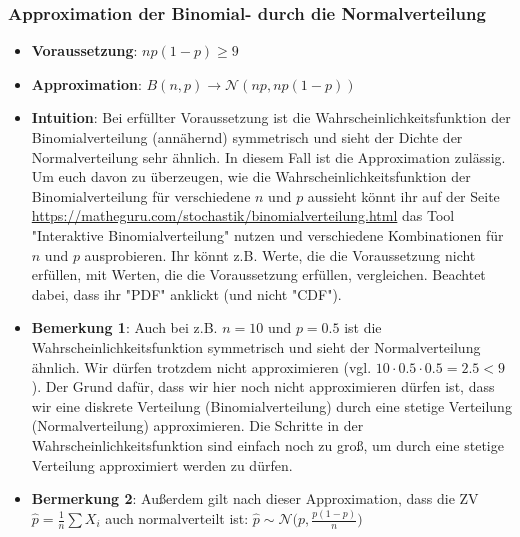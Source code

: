\documentclass[a4paper]{article}
\begin{document}
\subsubsection{Approximation der Binomial- durch die Normalverteilung}\label{sec:BinN}
\begin{itemize}
\item[] \textbf{Voraussetzung}: $np(1-p) \geq 9$
\item[] \textbf{Approximation}: $B(n,p) \rightarrow \mathcal{N}(np,np(1-p))$
\item[] \textbf{Intuition}: Bei erfüllter Voraussetzung ist die Wahrscheinlichkeitsfunktion der Binomialverteilung (annähernd) symmetrisch und sieht der Dichte der Normalverteilung sehr ähnlich. In diesem Fall ist die Approximation zulässig. Um euch davon zu überzeugen, wie die Wahrscheinlichkeitsfunktion der Binomialverteilung für verschiedene $n$ und $p$ aussieht könnt ihr auf der Seite \url{https://matheguru.com/stochastik/binomialverteilung.html} das Tool "Interaktive Binomialverteilung" nutzen und verschiedene Kombinationen für $n$ und $p$ ausprobieren. Ihr könnt z.B. Werte, die die Voraussetzung nicht erfüllen, mit Werten, die die Voraussetzung erfüllen, vergleichen. Beachtet dabei, dass ihr "PDF" anklickt (und nicht "CDF").
\item[] \textbf{Bemerkung 1}: Auch bei z.B. $n=10$ und $p=0.5$ ist die Wahrscheinlichkeitsfunktion symmetrisch und sieht der Normalverteilung ähnlich. Wir dürfen trotzdem nicht approximieren (vgl. $10\cdot0.5\cdot0.5=2.5<9$). Der Grund dafür, dass wir hier noch nicht approximieren dürfen ist, dass wir eine diskrete Verteilung (Binomialverteilung) durch eine stetige Verteilung (Normalverteilung) approximieren. Die Schritte in der Wahrscheinlichkeitsfunktion sind einfach noch zu groß, um durch eine stetige Verteilung approximiert werden zu dürfen.
\item[] \textbf{Bermerkung 2}: Außerdem gilt nach dieser Approximation, dass die ZV $\hat{p}=\frac{1}{n} \sum X_i$ auch normalverteilt ist: $\hat{p} \sim \mathcal{N}\Big(p,\frac{p(1-p)}{n}\Big)$
\end{itemize}
\end{document}
